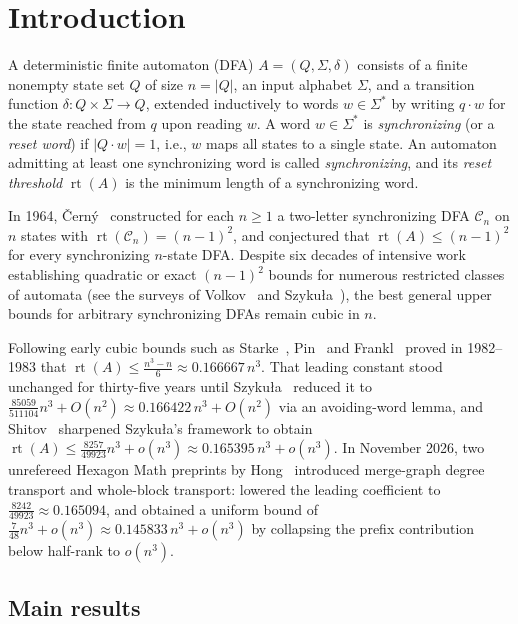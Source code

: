\documentclass[11pt]{article}
\theoremstyle{definition}
\theoremstyle{remark}
\newcommand{\rt}{\operatorname{rt}}
\begin{document}
\section{Introduction}\label{sec:intro}

A deterministic finite automaton (DFA) $A = (Q, \Sigma, \delta)$ consists of a finite nonempty state set $Q$ of size $n = |Q|$, an input alphabet $\Sigma$, and a transition function $\delta : Q \times \Sigma \to Q$, extended inductively to words $w \in \Sigma^*$ by writing $q \cdot w$ for the state reached from $q$ upon reading $w$. A word $w \in \Sigma^*$ is \emph{synchronizing} (or a \emph{reset word}) if $|Q \cdot w| = 1$, i.e., $w$ maps all states to a single state. An automaton admitting at least one synchronizing word is called \emph{synchronizing}, and its \emph{reset threshold} $\rt(A)$ is the minimum length of a synchronizing word.

In 1964, \v{C}ern\'y~\cite{Cerny1964} constructed for each $n \ge 1$ a two-letter synchronizing DFA $\mathcal{C}_n$ on $n$ states with $\rt(\mathcal{C}_n) = (n-1)^2$, and conjectured that $\rt(A) \le (n-1)^2$ for every synchronizing $n$-state DFA. Despite six decades of intensive work establishing quadratic or exact $(n-1)^2$ bounds for numerous restricted classes of automata (see the surveys of Volkov~\cite{Volkov2022,Volkov2026} and Szyku\l a~\cite{Szykula2026}), the best general upper bounds for arbitrary synchronizing DFAs remain cubic in $n$.

Following early cubic bounds such as Starke~\cite{Starke1966}, Pin~\cite{Pin1983} and Frankl~\cite{Frankl1982} proved in 1982--1983 that $\rt(A) \le \frac{n^3 - n}{6} \approx 0.166667\, n^3$. That leading constant stood unchanged for thirty-five years until Szyku\l a~\cite{Szykula2018} reduced it to $\frac{85059}{511104} n^3 + O(n^2) \approx 0.166422\, n^3 + O(n^2)$ via an avoiding-word lemma, and Shitov~\cite{Shitov2019} sharpened Szyku\l a's framework to obtain $\rt(A) \le \frac{8257}{49923} n^3 + o(n^3) \approx 0.165395\, n^3 + o(n^3)$. In November 2026, two unrefereed Hexagon Math preprints by Hong~\cite{Hong2026a,Hong2026b} introduced merge-graph degree transport and whole-block transport: \cite{Hong2026a} lowered the leading coefficient to $\frac{8242}{49923} \approx 0.165094$, and \cite{Hong2026b} obtained a uniform bound of $\frac{7}{48} n^3 + o(n^3) \approx 0.145833\, n^3 + o(n^3)$ by collapsing the prefix contribution below half-rank to $o(n^3)$.

\subsection{Main results}
\end{document}

